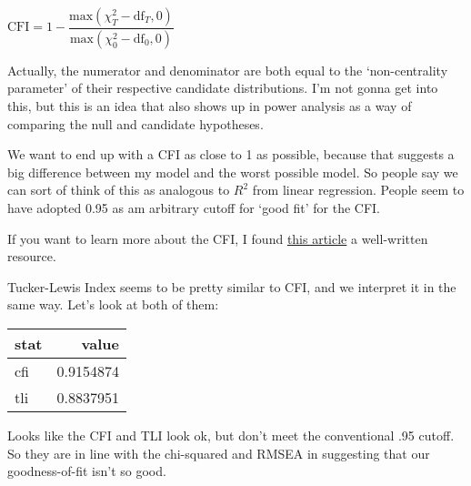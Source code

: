 \documentclass[
  letterpaper,
  DIV=11,
  numbers=noendperiod]{scrreprt}
\newenvironment{Shaded}{\begin{snugshade}}{\end{snugshade}}
\newcommand{\AttributeTok}[1]{\textcolor[rgb]{0.40,0.45,0.13}{#1}}
\newcommand{\CommentTok}[1]{\textcolor[rgb]{0.37,0.37,0.37}{#1}}
\newcommand{\FunctionTok}[1]{\textcolor[rgb]{0.28,0.35,0.67}{#1}}
\newcommand{\NormalTok}[1]{\textcolor[rgb]{0.00,0.23,0.31}{#1}}
\newcommand{\SpecialCharTok}[1]{\textcolor[rgb]{0.37,0.37,0.37}{#1}}
\newcommand{\StringTok}[1]{\textcolor[rgb]{0.13,0.47,0.30}{#1}}
\begin{document}
\(\text{CFI} = 1 - \dfrac{\text{max}(χ^2_T - \text{df}_T, 0)}{\text{max}(χ^2_0 - \text{df}_0, 0)}\)

Actually, the numerator and denominator are both equal to the
`non-centrality parameter' of their respective candidate distributions.
I'm not gonna get into this, but this is an idea that also shows up in
power analysis as a way of comparing the null and candidate hypotheses.

We want to end up with a CFI as close to 1 as possible, because that
suggests a big difference between my model and the worst possible model.
So people say we can sort of think of this as analogous to \(R^2\) from
linear regression. People seem to have adopted 0.95 as am arbitrary
cutoff for `good fit' for the CFI.

If you want to learn more about the CFI, I found
\href{https://scholarworks.umass.edu/cgi/viewcontent.cgi?article=1561\&context=pare}{this
article} a well-written resource.

Tucker-Lewis Index seems to be pretty similar to CFI, and we interpret
it in the same way. Let's look at both of them:

\begin{Shaded}
\end{Shaded}

\begin{longtable}[]{@{}lr@{}}
\toprule()
stat & value \\
\midrule()
\endhead
cfi & 0.9154874 \\
tli & 0.8837951 \\
\bottomrule()
\end{longtable}

Looks like the CFI and TLI look ok, but don't meet the conventional .95
cutoff. So they are in line with the chi-squared and RMSEA in suggesting
that our goodness-of-fit isn't so good.
\end{document}
